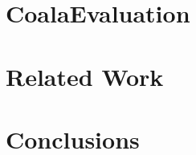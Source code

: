 \documentclass[pageno]{jpaper}
\newcommand{\sys}{Coala}
\begin{document}


\section{\sys Evaluation}
\label{sec:evaluation}



\section{Related Work}
\label{sec:related_work}



\section{Conclusions}
\label{sec:conclusions}





\end{document}
